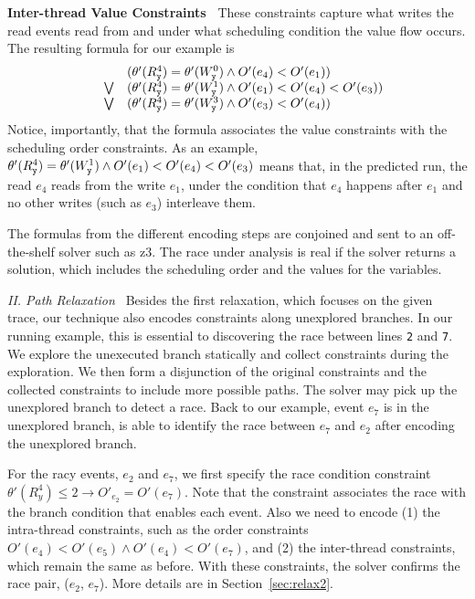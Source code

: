 {\bf Inter-thread Value Constraints\ } These constraints capture what writes the read events read from and under what scheduling condition the value flow occurs.  The resulting formula for our example is
$$
\begin{array}{lcl}
	& & (\theta'(R_{\tt y}^4)=\theta'(W_{\tt y}^0) \wedge O'(e_4) < O'(e_1) ) \\
& \bigvee &
	(\theta'(R_{\tt y}^4)=\theta'(W_{\tt y}^1) \wedge O'(e_1) < O'(e_4) < O'(e_3)) \\
& \bigvee &
	(\theta'(R_{\tt y}^4)=\theta'(W_{\tt y}^3) \wedge O'(e_3) < O'(e_4))
\end{array}
$$    
Notice, importantly, that the formula associates the value constraints 
with the scheduling order constraints. 
As an example, 
$\theta'(R_{\tt y}^4)=\theta'(W_{\tt y}^1) \wedge O'(e_1) < O'(e_4) < O'(e_3)$ 
means that, in the predicted run, the read $e_4$ reads from the write $e_1$, 
under the condition that $e_4$ happens after $e_1$ and no other  
writes (such as $e_3$) interleave them.

The formulas from the different encoding steps are conjoined and sent to an 
off-the-shelf solver such as {\sf z3}.  The race under analysis is real 
if the solver returns a solution, which includes the scheduling order 
and the values for the variables. 


\smallskip
\noindent
{\em II. Path Relaxation\ } 
Besides the first relaxation, which focuses on the given trace, our
technique also encodes constraints along unexplored branches. In our 
running example, this is essential to discovering the race between 
lines {\tt 2} and {\tt 7}. We explore the unexecuted branch statically 
and collect constraints during the exploration. We then form a disjunction  
of the original constraints and the collected constraints to include more 
possible  paths. The solver may pick up the unexplored branch to detect 
a race. Back to our example, event $e_7$ is in the unexplored branch, \tool
is able to identify the race between $e_7$ and $e_2$ after encoding 
the unexplored branch. 

For the racy events, $e_2$ and $e_7$, we first specify the race condition 
constraint  $\theta'(R^4_y)\leq 2\rightarrow O'_{e_2}=O'(e_7)$. Note that 
the constraint associates the race with the branch condition that 
enables each event.  Also we need to encode (1) the intra-thread constraints, 
such as the  order constraints $O'(e_4)<O'(e_5)\wedge O'(e_4)<O'(e_7)$, 
and (2) the inter-thread constraints, which remain the same as before. 
With these constraints, the solver confirms the race pair, ($e_2$, $e_7$). 
More details are in Section~\ref{sec:relax2}.



